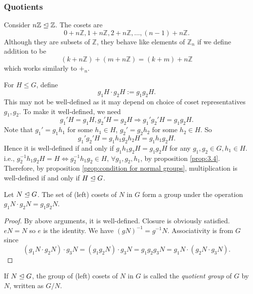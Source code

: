 \documentclass[a4paper]{article}
\begin{document}
\subsubsection{Quotients}
Consider $ n \mathbb{Z} \trianglelefteq \mathbb{Z} $. The cosets are
\[
  0+n \mathbb{Z}, 1+n \mathbb{Z} , 2+n \mathbb{Z} , \dots, (n-1)+n \mathbb{Z}
.\]
Although they are subsets of $ \mathbb{Z} $, they behave like
elements of $ \mathbb{Z}_n $ if we define addition to be
\[
  (k+n \mathbb{Z} )+(m+n \mathbb{Z} )=(k+m)+n \mathbb{Z}
\]
which works similarly to $ +_n $.

For $ H\le G $, define
\[
  g_1H\cdot g_2H:= g_1g_2H
.\]
This may not be well-defined as it may depend on choice of coset
representatives $g_1,g_2$.
To make it well-defined, we need
\[
  g_1'H=g_1H, g_2'H=g_2H \Longrightarrow g_1'g_2'H=g_1g_2H
.\]
Note that $ g_1'=g_1h_1 $ for some $h_1\in H$, $ g_2'=g_2h_2 $ for
some $h_2\in H$. So
\[
  g_1'g_2'H=g_1h_1g_2h_2H=g_1h_1g_2H
.\]
Hence it is well-defined if and only if $  g_1h_1g_2H=g_1g_2H $ for
any $ g_1,g_2\in G, h_1\in H $. i.e., $ g_2^{-1}h_1g_2H=H
\Leftrightarrow g_2^{-1}h_1g_2\in H $, $ \forall g_1,g_2,h_1 $, by
proposition \ref{prop:3.4}. Therefore, by proposition
\ref{prop:condition for normal groups}, multiplication is
well-defined if and only if $ H\trianglelefteq G $.
\begin{proposition}\label{prop:set of one-sided cosets form a group}
  Let $ N\trianglelefteq G $. The set of (left) cosets of $N$ in $G$ form a
  group under the operation $ g_1N\cdot g_2N=g_1g_2 N $.
\end{proposition}
\begin{proof}
  By above arguments, it is well-defined. Closure is obviously
  satisfied. $eN=N$ so $e$ is the identity. We have $
  (gN)^{-1}=g^{-1}N $. Associativity is from $G$ since
  \[
    (g_1N\cdot g_2N)\cdot g_3N=(g_1g_2N)\cdot
    g_3N=g_1g_2g_3N=g_1N\cdot(g_2N\cdot g_3N)
  .\]
\end{proof}
\begin{definition}
  If $ N \trianglelefteq G $, the group of (left) cosets of $N$ in $G$ is
  called the \textit{quotient group} of $G$ by $N$, written as $ G/N $.
\end{definition}
\end{document}

